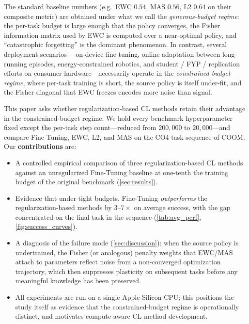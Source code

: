 \documentclass[11pt,a4paper]{article}
\begin{document}
The standard baseline numbers (e.g.\ EWC $0.54$, MAS $0.56$, L2 $0.64$ on
their composite metric) are obtained under what we call the \emph{generous-budget
regime}: the per-task budget is large enough that the policy converges, the
Fisher information matrix used by EWC \cite{kirkpatrick2017ewc} is computed
over a near-optimal policy, and ``catastrophic forgetting'' is the
dominant phenomenon. In contrast, several deployment scenarios---
on-device fine-tuning, online adaptation between long-running episodes,
energy-constrained robotics, and student / FYP / replication efforts on
consumer hardware---necessarily operate in the \emph{constrained-budget
regime}, where per-task training is short, the source policy is itself
under-fit, and the Fisher diagonal that EWC freezes encodes more noise than
signal.

This paper asks whether regularization-based CL methods retain their
advantage in the constrained-budget regime. We hold every benchmark
hyperparameter fixed except the per-task step count---reduced from
$200{,}000$ to $20{,}000$---and compare Fine-Tuning, EWC, L2, and MAS on
the CO4 task sequence of COOM. Our \textbf{contributions} are:
\begin{itemize}[leftmargin=1.5em,topsep=2pt,itemsep=2pt]
    \item A controlled empirical comparison of three regularization-based CL
        methods against an unregularized Fine-Tuning baseline at one-tenth
        the training budget of the original benchmark
        (\cref{sec:results}).
    \item Evidence that under tight budgets, Fine-Tuning \emph{outperforms}
        the regularization-based methods by $3$--$7\times$ on average
        success, with the gap concentrated on the final task in the
        sequence (\cref{tab:avg_perf}, \cref{fig:success_curves}).
    \item A diagnosis of the failure mode (\cref{sec:discussion}): when the
        source policy is undertrained, the Fisher (or analogous) penalty
        weights that EWC/MAS attach to parameters reflect noise from a
        non-converged optimization trajectory, which then suppresses
        plasticity on subsequent tasks before any meaningful knowledge has
        been preserved.
    \item All experiments are run on a single Apple-Silicon CPU; this
        positions the study itself as evidence that the constrained-budget
        regime is operationally distinct, and motivates compute-aware CL
        method development.
\end{itemize}
\end{document}

